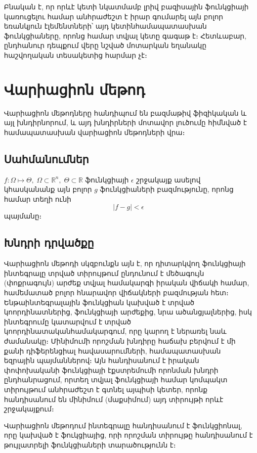 \documentclass[fleqn, bachelor,subf,12pt,notitlepage]{disser}
\begin{document}
\noindent Բնական է, որ որևէ կետի նկատմամբ լրիվ բազիսային ֆունկցիայի կառուցելու համար անհրաժեշտ է իրար գումարել այն բոլոր եռանկյուն էլեմենտների՝ այդ կետին\newline համապատասխան ֆունկցիաները, որոնց համար տվյալ կետը գագաթ է։ Հետևաբար, ընդհանուր դեպքում վերը նշված մոտարկան եղանակը հաշվողական տեսակետից հարմար չէ։

\newpage
\section*{Վարիացիոն մեթոդ}

Վարիացիոն մեթոդները հանդիպում են բազմաթիվ ֆիզիկական և այլ խնդիրնորում, և այդ խնդիրների մոտավոր լուծումը հիմնված է համապատասխան վարիացիոն մեթոդների վրա։

\subsection*{Սահմանումներ}
$f : \Omega \mapsto \Theta, \; \Omega \subset \mathbb{R}^{n}, \; \Theta \subset \mathbb{R}$ ֆունկցիայի $\epsilon$ շրջակայք ասելով կհասկանանք այն բոլոր $g$ ֆունկցիաների բազմությունը, որոնց համար տեղի ունի
$$ \left|f-g\right| < \epsilon$$
պայմանը։



\subsection*{Խնդրի դրվածքը}

Վարիացիոն մեթոդի սկզբունքն այն է, որ դիտարկվող ֆունկցիայի ինտեգրալը տրված տիրույթում ընդունում է մեծագույն (փոքրագույն) արժեք տվյալ համակարգի իրական վիճակի համար, համեմատած բոլոր հնարավոր վիճակների բազմության հետ։ \newline Ենթաինտեգրալային ֆունկցիան կախված է տրված կոորդինատներից, ֆունկցիայի արժեքից, նրա ածանցյալներից, իսկ ինտեգրումը կատարվում է տրված կոորդինատական\newline համակարգում, որը կարող է ներառել նաև ժամանակը։ Մինիմումի որոշման խնդիրը հաճախ բերվում է մի քանի դիֆերենցիալ հավասարումների, համապատասխան եզրային պայմաններով։ \newline Այն հանդիսանում է իրական փոփոխականի ֆունկցիայի էքստրեմումի որոնման խնդրի ընդհանրացում, որտեղ տվյալ ֆունկցիայի համար կոմպակտ տիրույթում անհրաժեշտ է գտնել այպիսի կետեր, որոնք հանդիսանում են մինիմում (մաքսիմում) այդ տիրույթի որևէ շրջակայքում։

Վարիացիոն մեթոդում ինտեգրալը հանդիսանում է ֆունկցիոնալ, որը կախված է ֆուկցիայից, որի որոշման տիրույթը հանդիսանում է թույլատրելի ֆունկցիաների \newline տարածությունն է։ 
\end{document}
